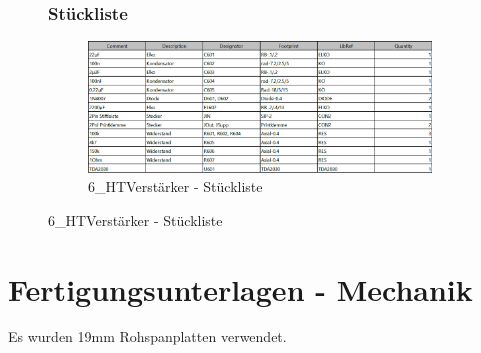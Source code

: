 \begin{figure}
	\subsubsection*{Stückliste}
	\begin{figure} [H]
		\centering
		\includegraphics[width=1\textwidth]{img/Print6/HTVerstaerker-Blist.png}
		\caption{6\_HTVerstärker - Stückliste}
		\label {fig:8.10.21}
	\end{figure}
\end{figure}



\newpage
\section{Fertigungsunterlagen - Mechanik}\label{sec:8.11}
Es wurden 19mm Rohspanplatten verwendet.
